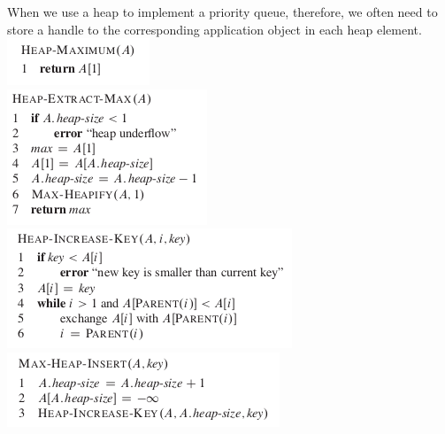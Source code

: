 \documentclass[11pt]{article}
\begin{document}
When we use a heap to implement a priority queue, therefore, we often need to store a handle to the corresponding application object in each heap element. \\


\includegraphics[width=.9\linewidth]{pics/c6_heap_maximum.png} \\

\includegraphics[width=.9\linewidth]{pics/c6_heap_extract_max.png} \\

\includegraphics[width=.9\linewidth]{pics/c6_heap_increase_key.png} \\

\includegraphics[width=.9\linewidth]{pics/c6_max_heap_insert.png} \\
\end{document}
